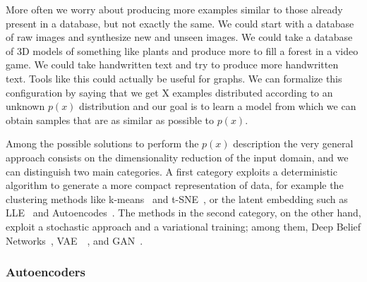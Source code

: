 More often we worry about producing more examples similar to those already present in a database, but not exactly the same. We could start with a database of raw images and synthesize new and unseen images. We could take a database of 3D models of something like plants and produce more to fill a forest in a video game. We could take handwritten text and try to produce more handwritten text. Tools like this could actually be useful for graphs. We can formalize this configuration by saying that we get X examples distributed according to an unknown $p(x)$ distribution and our goal is to learn a model from which we can obtain samples that are as similar as possible to $p(x)$.

Among the possible solutions to perform the $p(x)$ description the very general approach consists on the dimensionality reduction of the input domain, and we can distinguish two main categories. A first category exploits a deterministic algorithm to generate a more compact representation of data, for example the clustering methods like k-means~\cite{Kanungo00anefficient} and t-SNE~\cite{vanDerMaaten2008}, or the latent embedding such as LLE~\cite{Roweis2000} and Autoencodes~\cite{Goodfellow-et-al-2016}.
The methods in the second category, on the other hand, exploit a stochastic approach and a variational training; among them, Deep Belief Networks~\cite{hinton_DBN}, \ac{VAE}~\cite{DBLP:journals/corr/KingmaW13}~\cite{DBLP:conf/iclr/2014}, and GAN~\cite{Goodfellow:2014:GAN:2969033.2969125}.

\subsubsection{Autoencoders}

